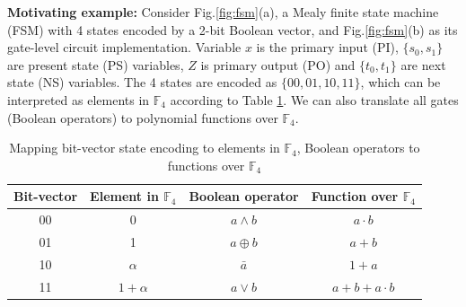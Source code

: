 \begin{figure}[hbt]
\end{figure}

\begin{Example}
\label{ex:motiv}
{\bf Motivating example:} Consider Fig.\ref{fig:fsm}(a), a Mealy finite state machine (FSM) with
4 states encoded by a 2-bit Boolean vector, and Fig.\ref{fig:fsm}(b) as its gate-level circuit implementation.
Variable $x$ is the primary input (PI), $\{s_0,s_1\}$ are present state (PS) variables, $Z$ is primary
output (PO) and $\{t_0, t_1\}$ are next state (NS) variables. The 4 states are encoded as
$\{00,01,10,11\}$, which can be interpreted as elements in $\mathbb F_4$ according to Table \ref{tab:booltof4}.
We can also translate all gates (Boolean operators) to polynomial functions over $\mathbb F_4$.
\vspace{-0.1in}
\begin{table}[htb]
\centering
\caption{Mapping bit-vector state encoding to elements in $\mathbb F_4$, Boolean operators to functions over $\mathbb F_4$}
\begin{tabular}{|c|c||c|c|} 
\hline
Bit-vector & Element in $\mathbb F_4$ & Boolean operator & Function over $\mathbb F_4$ \\
\hline
\hline
00 & 0 & $a\land b$ & $a\cdot b$ \\
\hline
01 & 1 & $a\oplus b$ & $a+b$ \\
\hline
10 & $\alpha$ & $\bar{a}$ & $1+a$ \\
\hline
11 & $1+\alpha$ & $a\lor b$ & $a+b+a\cdot b$\\
\hline
\end{tabular}
\label{tab:booltof4}  
\end{table}


\end{Example}
